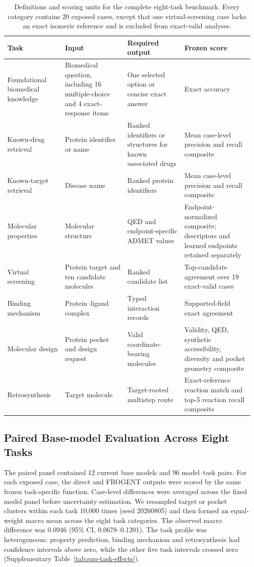 \documentclass{article}
\begin{document}
\begin{table}[htbp]
\centering
\small
\caption{Definitions and scoring units for the complete eight-task benchmark. Every category contains 20 exposed cases, except that one virtual-screening case lacks an exact isomeric reference and is excluded from exact-valid analyses.}
\label{tab:sup-eight-task-definitions}
\begin{tabular}{p{2.7cm}p{3.2cm}p{3.4cm}p{3.0cm}}
\toprule
Task & Input & Required output & Frozen score \\
\midrule
Foundational biomedical knowledge & Biomedical question, including 16 multiple-choice and 4 exact-response items & One selected option or concise exact answer & Exact accuracy \\
Known-drug retrieval & Protein identifier or name & Ranked identifiers or structures for known associated drugs & Mean case-level precision and recall composite \\
Known-target retrieval & Disease name & Ranked protein identifiers & Mean case-level precision and recall composite \\
Molecular properties & Molecular structure & QED and endpoint-specific ADMET values & Endpoint-normalized composite; descriptors and learned endpoints retained separately \\
Virtual screening & Protein target and ten candidate molecules & Ranked candidate list & Top-candidate agreement over 19 exact-valid cases \\
Binding mechanism & Protein--ligand complex & Typed interaction records & Supported-field exact agreement \\
Molecular design & Protein pocket and design request & Valid coordinate-bearing molecules & Validity, QED, synthetic accessibility, diversity and pocket geometry composite \\
Retrosynthesis & Target molecule & Target-rooted multistep route & Exact-reference reaction match and top-5 reaction recall composite \\
\bottomrule
\end{tabular}
\end{table}

\subsection{Paired Base-model Evaluation Across Eight Tasks}

The paired panel contained 12 current base models and 96 model--task pairs. For each exposed case, the direct and FROGENT outputs were scored by the same frozen task-specific function. Case-level differences were averaged across the fixed model panel before uncertainty estimation. We resampled target or pocket clusters within each task 10,000 times (seed 20260805) and then formed an equal-weight macro mean across the eight task categories. The observed macro difference was 0.0946 (95\% CI, 0.0678--0.1201). The task profile was heterogeneous: property prediction, binding mechanism and retrosynthesis had confidence intervals above zero, while the other five task intervals crossed zero (Supplementary Table~\ref{tab:sup-task-effects}).
\end{document}
